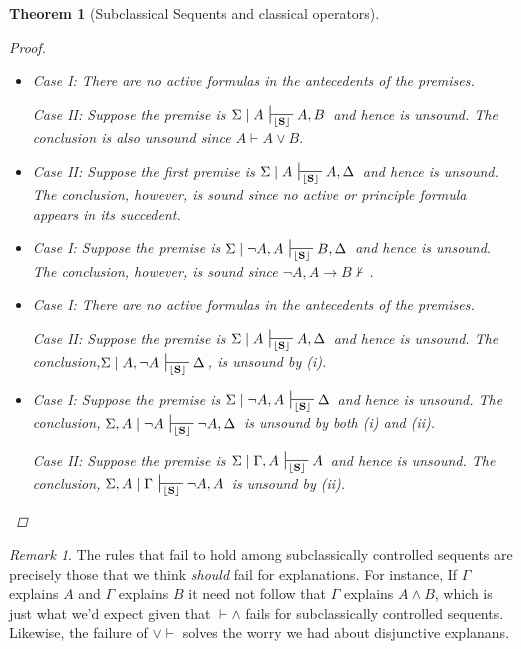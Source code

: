 \documentclass{article}                     %
\theoremstyle{theorem}
\newtheorem{theorem}{Theorem}
\theoremstyle{corollary}
\theoremstyle{lemma}
\theoremstyle{definition}
\theoremstyle{remark}
\newtheorem{remark}{Remark}
\theoremstyle{definition}
\theoremstyle{notation}
\theoremstyle{definition}
\theoremstyle{proposition}
\theoremstyle{definition}
\begin{document}
\begin{theorem}[Subclassical Sequents and classical operators]
\begin{proof}
\begin{itemize}[itemsep=3mm]
	\item[$\checkmark \vdash\vee $]
Case I: There are no active formulas in the antecedents of the premises.

Case II: Suppose the premise is $\Sigma\mid A\,\sststile{\lfloor\mathbf{S}\rfloor}{} A, B\,$ and hence is unsound. The conclusion is also unsound since $ A \vdash A \vee B. $

 \item[$ \to\vdash $]

Case II: Suppose the first premise is $\Sigma\mid A\,\sststile{\lfloor\mathbf{S}\rfloor}{} A, \Delta\,$ and hence is unsound. The conclusion, however, is sound since no active or principle formula appears in its succedent.

	\item[$ \vdash\to $]
Case I: Suppose the premise is $\Sigma\mid\neg A ,A \,\sststile{\lfloor\mathbf{S}\rfloor}{} B, \Delta\,$ and hence is unsound. The conclusion, however, is sound since $ \neg A, A \to B \nvdash \,. $

	\item[$\checkmark \neg\vdash $]
Case I: There are no active formulas in the antecedents of the premises.

Case II: Suppose the premise is $\Sigma\mid A \,\sststile{\lfloor\mathbf{S}\rfloor}{} A, \Delta\,$ and hence is unsound. The conclusion,$\Sigma\mid A, \neg A \,\sststile{\lfloor\mathbf{S}\rfloor}{} \Delta\,$, is unsound by (i). 

	\item[$\checkmark \vdash\neg $]
Case I: Suppose the premise is $\Sigma\mid\neg A ,A \,\sststile{\lfloor\mathbf{S}\rfloor}{} \Delta\,$ and hence is unsound. The conclusion, $\Sigma, A\mid\neg A \,\sststile{\lfloor\mathbf{S}\rfloor}{} \neg A, \Delta\,$ is unsound by both (i) and (ii).

Case II: Suppose the premise is $\Sigma\mid \Gamma, A \,\sststile{\lfloor\mathbf{S}\rfloor}{} A \,$ and hence is unsound. The conclusion, $\Sigma, A\mid\Gamma \,\sststile{\lfloor\mathbf{S}\rfloor}{} \neg A, A\,$ is unsound by (ii).

\end{itemize}
\end{proof}
\end{theorem}

\begin{remark}
The rules that fail to hold among subclassically controlled sequents are precisely those that we think \textit{should} fail for explanations. For instance, If $ \Gamma $ explains $ A $ and $ \Gamma $ explains $ B $ it need not follow that $ \Gamma $ explains $ A \wedge B$, which is just what we'd expect given that $ \vdash\wedge $ fails for subclassically controlled sequents. Likewise, the failure of $ \vee\vdash $ solves the worry we had about disjunctive explanans. 
\end{remark}
\end{document}
